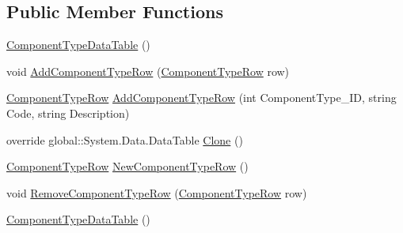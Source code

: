 \subsection*{Public Member Functions}
\begin{DoxyCompactItemize}
\item 
\hyperlink{class_env_int_1_1_win32_1_1_field_tech_1_1_manager_1_1_data_sets_1_1_guide_ware_mobile_data_set_1_1_component_type_data_table_a412c2968b4833e69d7d282db5364292e}{Component\+Type\+Data\+Table} ()
\item 
void \hyperlink{class_env_int_1_1_win32_1_1_field_tech_1_1_manager_1_1_data_sets_1_1_guide_ware_mobile_data_set_1_1_component_type_data_table_a7bdbd50957f4f9ef5d2e7c75842bf215}{Add\+Component\+Type\+Row} (\hyperlink{class_env_int_1_1_win32_1_1_field_tech_1_1_manager_1_1_data_sets_1_1_guide_ware_mobile_data_set_1_1_component_type_row}{Component\+Type\+Row} row)
\item 
\hyperlink{class_env_int_1_1_win32_1_1_field_tech_1_1_manager_1_1_data_sets_1_1_guide_ware_mobile_data_set_1_1_component_type_row}{Component\+Type\+Row} \hyperlink{class_env_int_1_1_win32_1_1_field_tech_1_1_manager_1_1_data_sets_1_1_guide_ware_mobile_data_set_1_1_component_type_data_table_af9070dd91abe3423f1e0a03e14a335b4}{Add\+Component\+Type\+Row} (int Component\+Type\+\_\+\+I\+D, string Code, string Description)
\item 
override global\+::\+System.\+Data.\+Data\+Table \hyperlink{class_env_int_1_1_win32_1_1_field_tech_1_1_manager_1_1_data_sets_1_1_guide_ware_mobile_data_set_1_1_component_type_data_table_aee715d9b4b39977a3479231c4c5e7896}{Clone} ()
\item 
\hyperlink{class_env_int_1_1_win32_1_1_field_tech_1_1_manager_1_1_data_sets_1_1_guide_ware_mobile_data_set_1_1_component_type_row}{Component\+Type\+Row} \hyperlink{class_env_int_1_1_win32_1_1_field_tech_1_1_manager_1_1_data_sets_1_1_guide_ware_mobile_data_set_1_1_component_type_data_table_a0385abfa9e46a887f223d0a90205e450}{New\+Component\+Type\+Row} ()
\item 
void \hyperlink{class_env_int_1_1_win32_1_1_field_tech_1_1_manager_1_1_data_sets_1_1_guide_ware_mobile_data_set_1_1_component_type_data_table_a7b93e932720c53787be4833406918284}{Remove\+Component\+Type\+Row} (\hyperlink{class_env_int_1_1_win32_1_1_field_tech_1_1_manager_1_1_data_sets_1_1_guide_ware_mobile_data_set_1_1_component_type_row}{Component\+Type\+Row} row)
\item 
\hyperlink{class_env_int_1_1_win32_1_1_field_tech_1_1_manager_1_1_data_sets_1_1_guide_ware_mobile_data_set_1_1_component_type_data_table_a412c2968b4833e69d7d282db5364292e}{Component\+Type\+Data\+Table} ()

\end{DoxyCompactItemize}
